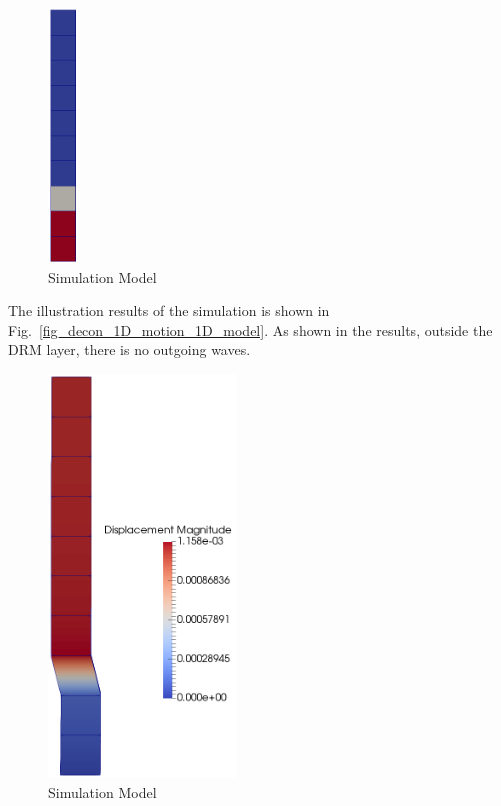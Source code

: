 \begin{figure}[H]
  \centering
  \includegraphics[width = 0.8cm]{./Figure-files/Day2/Deconvolution_1D_Motions/Free_fields_1D_model_with_DRM/overview.png}
  \caption{Simulation Model}
  \label{fig_decon_1D_motion_1D_model1}
\end{figure}

The illustration results of the simulation is shown in Fig.~\ref{fig_decon_1D_motion_1D_model}.
As shown in the results, outside the DRM layer, there is no outgoing waves. 

\begin{figure}[H]
  \centering
  \includegraphics[width = 5cm]{./Figure-files/Day2/Deconvolution_1D_Motions/Free_fields_1D_model_with_DRM/DRM1D_results.png}
  \caption{Simulation Model}
  \label{fig_decon_1D_motion_1D_model_results}
\end{figure}


\clearpage
\newpage
